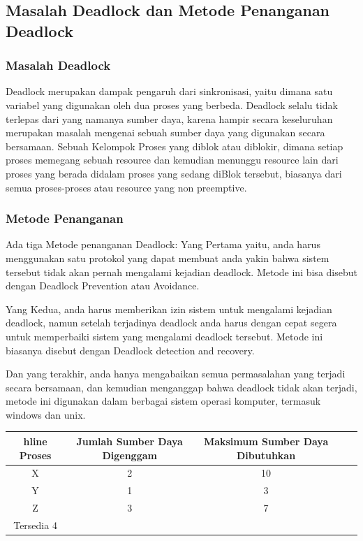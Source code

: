 \subsection {Masalah Deadlock dan Metode Penanganan Deadlock}
\subsubsection {Masalah Deadlock}
	Deadlock merupakan dampak pengaruh dari sinkronisasi, yaitu dimana satu variabel yang digunakan oleh dua proses yang berbeda. Deadlock selalu tidak terlepas dari yang namanya sumber daya, karena hampir secara keseluruhan merupakan masalah mengenai sebuah sumber daya yang digunakan secara bersamaan. Sebuah Kelompok Proses yang diblok atau diblokir, dimana setiap proses memegang sebuah resource dan kemudian menunggu resource lain dari proses yang berada didalam proses yang sedang diBlok tersebut, biasanya dari semua proses-proses atau resource yang non preemptive.
	
\subsubsection {Metode Penanganan}
	Ada tiga Metode penanganan Deadlock:
	Yang Pertama yaitu, anda harus menggunakan satu protokol yang dapat membuat anda yakin bahwa sistem tersebut tidak akan pernah mengalami kejadian deadlock. Metode ini bisa disebut dengan Deadlock Prevention atau Avoidance.
	
	Yang Kedua, anda harus memberikan izin sistem untuk mengalami kejadian deadlock, namun setelah terjadinya deadlock anda harus dengan cepat segera untuk memperbaiki sistem yang mengalami deadlock tersebut. Metode ini biasanya disebut dengan Deadlock detection and recovery.
	
	Dan yang terakhir, anda hanya mengabaikan semua permasalahan yang terjadi secara bersamaan, dan kemudian menganggap bahwa deadlock tidak akan terjadi, metode ini digunakan dalam berbagai sistem operasi komputer, termasuk windows dan unix.

\begin{table}[H]
\begin{tabular}{|c|c|c|c|c|}
hline
Proses & Jumlah Sumber Daya Digenggam & Maksimum Sumber Daya Dibutuhkan\\
\hline
X   & 2 & 10\\
Y   & 1 & 3\\
Z   & 3 & 7\\
\hline
Tersedia 4
\hline
\end{tabular}
\end{table}


